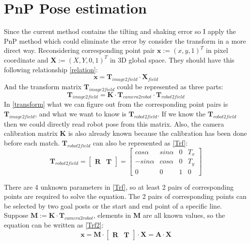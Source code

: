 \section{PnP Pose estimation}
Since the current method contains the tilting and shaking error so I apply the PnP method \cite{ETHPnP} which could eliminate the error by consider the transform in a more direct way. Reconsidering corresponding point pair $\mathbf{x}:=(x,y,1)^T$ in pixel coordinate and $\mathbf{X}:=(X,Y,0,1)^T$ in 3D global space. They should have this following relationship \eqref{relation}:
\begin{equation}
\mathbf{x} = \mathbf{T}_{image2field} \cdot \mathbf{X}_{field} \label{relation}
\end{equation}
And the transform matrix $\mathbf{T}_{image2field}$ could be represented as three parts: 
\begin{equation}
\mathbf{T}_{image2field}=\mathbf{K} \cdot \mathbf{T}_{camera2robot} \cdot \mathbf{T}_{robot2field} \label{transform}
\end{equation}
In \eqref{transform} what we can figure out from the corresponding point pairs is $\mathbf{T}_{image2field}$, and what we want to know is $\mathbf{T}_{robot2field}$. If we know the $\mathbf{T}_{robot2field}$ then we could directly read robot pose from this matrix. Also, the camera calibration matrix $\mathbf{K}$ is also already known because the calibration has been done before each match. 
$\mathbf{T}_{robot2field}$ can also be represented as \eqref{Trf}:
\begin{equation}\mathbf{T}_{robot2field}=
\begin{bmatrix}
\mathbf{R} & \mathbf{T}
\end{bmatrix}=
\begin{bmatrix}
cos\alpha & sin\alpha & 0 & T_x\\
-sin\alpha & cos\alpha & 0 & T_y\\
0 & 0 & 1 & 0
\end{bmatrix} \label{Trf}
\end{equation}

There are 4 unknown parameters in \eqref{Trf}, so at least 2 pairs of corresponding points are required to solve the equation. The 2 pairs of corresponding points can be selected by two goal posts or the start and end point of a specific line. Suppose $\mathbf{M}:=\mathbf{K} \cdot \mathbf{T}_{camera2robot}$, elements in $\mathbf{M}$ are all known values, so the equation can be written as \eqref{Trf2}:
\begin{equation}\mathbf{x}=\mathbf{M} \cdot
\begin{bmatrix}
\mathbf{R} & \mathbf{T}
\end{bmatrix} \cdot \mathbf{X} =\mathbf{A}\cdot \mathbf{X}
\label{Trf2}
\end{equation}

